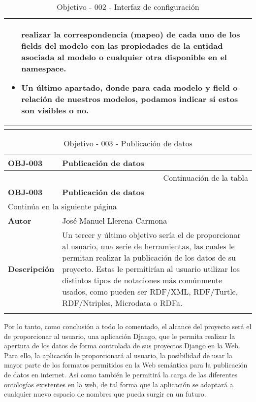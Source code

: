 \begin{center}
\begin{longtable}{||p{3.4cm}|p{12cm}||}
\begin{itemize}
                        realizar la correspondencia (mapeo) de cada uno de los
                        fields del modelo con las propiedades de la entidad
                        asociada al modelo o cualquier otra disponible en el
                        namespace.
                 \item Un último apartado, donde para cada modelo y field o
                        relación de nuestros modelos, podamos indicar si estos
                        son visibles o no.
             \end{itemize}\\
\hline
\hline
\caption{\label{tab:obj002} Objetivo - 002 - Interfaz de configuración} 
\end{longtable}
\end{center}


\begin{center}
\begin{longtable}{||p{3.4cm}|p{12cm}||}
 \hline \hline \bf OBJ-003 &  \bf Publicación de datos \\
\hline
\endfirsthead
\hline \multicolumn{2}{|r|}{{Continuación de la tabla}} \\ \hline
 \hline \bf OBJ-003 &  \bf Publicación de datos \\
\hline
\endhead
\hline \multicolumn{2}{|l|}{{Continúa en la siguiente página}} \\ \hline
\endfoot
\endlastfoot
 \hline \bf Autor & José Manuel Llerena Carmona \\
 \hline \bf Descripción & Un tercer y último objetivo sería el de proporcionar
             al usuario, una serie de herramientas, las cuales le permitan
             realizar la publicación de los datos de su proyecto. Estas le
             permitirían al usuario utilizar los distintos tipos de notaciones
             más comúnmente usados, como pueden ser RDF/XML, RDF/Turtle,
             RDF/Ntriples, Microdata o RDFa.\\
\hline
\hline
\caption{\label{tab:obj003} Objetivo - 003 - Publicación de datos} 
\end{longtable}
\end{center}


Por lo tanto, como conclusión a todo lo comentado, el alcance del proyecto será
el de proporcionar al usuario, una aplicación Django, que le permita realizar la
apertura de los datos de forma controlada de sus proyectos Django en la Web.
Para ello, la aplicación le proporcionará al usuario, la posibilidad de usar la
mayor parte de los formatos permitidos en la Web semántica para la publicación
de datos en internet. Así como también le permitirá la carga de las diferentes
ontologías existentes en la web, de tal forma que la aplicación se adaptará a
cualquier nuevo espacio de nombres que pueda surgir en un futuro.

